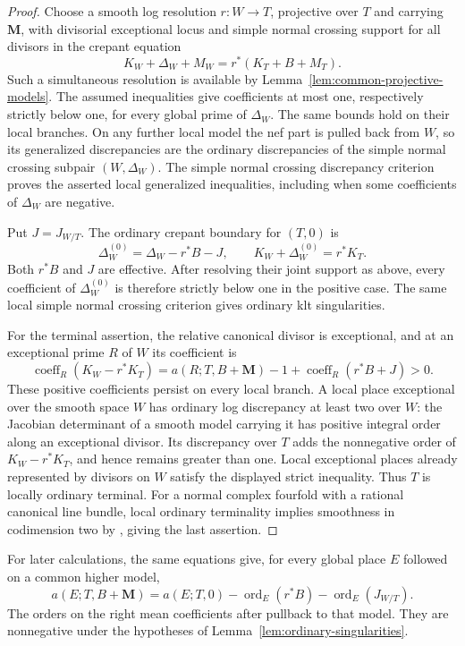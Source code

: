 \documentclass[11pt]{amsart}
\theoremstyle{definition}
\theoremstyle{remark}
\numberwithin{equation}{section}
\newcommand{\M}{\mathbf{M}}
\DeclareMathOperator{\ord}{ord}
\begin{document}
\begin{proof}
Choose a smooth log resolution $r:W\to T$, projective over $T$ and carrying $\M$,
with divisorial exceptional locus and simple normal crossing support
for all divisors in the crepant equation
\[
 K_W+\Delta_W+M_W=r^*(K_T+B+M_T).
\]
Such a simultaneous resolution is available by
Lemma~\ref{lem:common-projective-models}.  The assumed inequalities
give coefficients at most one, respectively strictly below one, for
every global prime of $\Delta_W$.  The same bounds hold on their local
branches.  On any further local model the nef part is pulled back from
$W$, so its generalized discrepancies are the ordinary discrepancies
of the simple normal crossing subpair $(W,\Delta_W)$.  The simple
normal crossing discrepancy criterion proves the asserted local
generalized inequalities, including when some coefficients of
$\Delta_W$ are negative.

Put $J=J_{W/T}$.  The ordinary crepant boundary for $(T,0)$ is
\begin{equation}\label{eq:ordinary-crepant-boundary}
 \Delta_W^{(0)}=\Delta_W-r^*B-J,
 \qquad K_W+\Delta_W^{(0)}=r^*K_T.
\end{equation}
Both $r^*B$ and $J$ are effective.  After resolving their joint support
as above, every coefficient of $\Delta_W^{(0)}$ is therefore strictly
below one in the positive case.  The same local simple normal crossing
criterion gives ordinary klt singularities.

For the terminal assertion, the relative canonical divisor is
exceptional, and at an exceptional prime $R$ of $W$ its coefficient is
\[
 \operatorname{coeff}_R(K_W-r^*K_T)
 =a(R;T,B+\M)-1+\operatorname{coeff}_R(r^*B+J)>0.
\]
These positive coefficients persist on every local branch.  A local
place exceptional over the smooth space $W$ has ordinary log
discrepancy at least two over $W$: the Jacobian determinant of a smooth
model carrying it has positive integral order along an exceptional
divisor.  Its discrepancy over $T$ adds the nonnegative order of
$K_W-r^*K_T$, and hence remains greater than one.  Local exceptional
places already represented by divisors on $W$ satisfy the displayed
strict inequality.  Thus $T$ is locally ordinary terminal.
For a normal complex fourfold with a rational canonical line bundle,
local ordinary terminality implies smoothness in codimension two by
\cite[Lemma~2.3]{CanonicalKahler}, giving the last assertion.
\end{proof}

For later calculations, the same equations give, for every global place
$E$ followed on a common higher model,
\begin{equation}\label{eq:generalized-ordinary-discrepancy}
 a(E;T,B+\M)
 =a(E;T,0)-\ord_E(r^*B)-\ord_E(J_{W/T}).
\end{equation}
The orders on the right mean coefficients after pullback to that model.
They are nonnegative under the hypotheses of
Lemma~\ref{lem:ordinary-singularities}.
\end{document}
